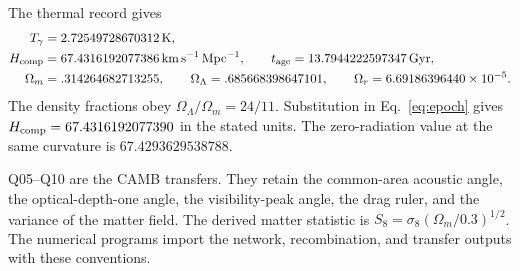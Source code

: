 \documentclass[aps,prx,onecolumn,10pt,notitlepage,nofootinbib,longbibliography]{revtex4-2}
\numberwithin{equation}{section}
\numberwithin{table}{section}
\begin{document}
The thermal record gives
\begin{align}
 T_\gamma&=2.72549728670312\,\mathrm K,\notag\\
 H_{\rm comp}&=67.4316192077386\,\mathrm{km\,s^{-1}\,Mpc^{-1}},\qquad
 t_{\rm age}=13.7944222597347\,\mathrm{Gyr},\notag\\
 \Omega_m&=.314264682713255,\qquad
 \Omega_\Lambda=.685668398647101,\qquad
 \Omega_r=6.69186396440\times10^{-5}.
\end{align}
The density fractions obey $\Omega_\Lambda/\Omega_m=24/11$. Substitution in Eq.~\eqref{eq:epoch} gives $H_{\rm comp}=67.4316192077390$ in the stated units. The zero-radiation value at the same curvature is $67.4293629538788$.

Q05--Q10 are the CAMB transfers. They retain the common-area acoustic angle, the optical-depth-one angle, the visibility-peak angle, the drag ruler, and the variance of the matter field. The derived matter statistic is $S_8=\sigma_8(\Omega_m/0.3)^{1/2}$. The numerical programs import the network, recombination, and transfer outputs with these conventions.
\end{document}
